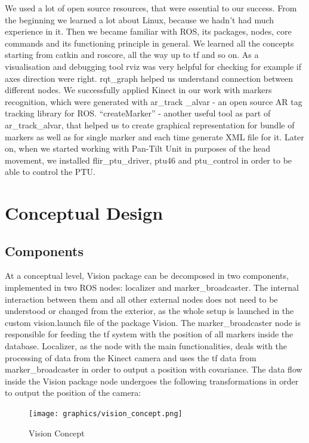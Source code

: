 We used a lot of open source resources, that were essential to our success. From the beginning we learned a lot about Linux, because we hadn’t had much experience in it. Then we became familiar with ROS, its packages, nodes, core commands and its functioning principle in general. We learned all the concepts starting from catkin and roscore, all the way up to tf and so on. As a visualisation and debugging tool rviz was very helpful for checking for example if axes direction were right. rqt\_graph helped us understand connection between different nodes. We successfully applied Kinect in our work with markers recognition, which were generated with ar\_track \_alvar - an open source AR tag tracking library for ROS. “createMarker” - another useful tool as part of ar\_track\_alvar, that helped us to create graphical representation for bundle of markers as well as for single marker and each time generate XML file for it. Later on, when we started working with Pan-Tilt Unit in purposes of the head movement, we installed flir\_ptu\_driver, ptu46 and ptu\_control in order to be able to control the PTU.

\section{Conceptual Design}

\subsection{Components}
At a conceptual level, Vision package can be decomposed in two components, implemented in two ROS nodes: localizer and marker\_broadcaster. The internal interaction between them and all other external nodes does not need to be understood or changed from the exterior, as the whole setup is launched in the custom vision.launch file of the package Vision.
The marker\_broadcaster node is responsible for feeding the tf system with the position of all markers inside the database. Localizer, as the node with the main functionalities, deals with the processing of data from the Kinect camera and uses the tf data from marker\_broadcaster in order to output a position with covariance. The data flow inside the Vision package node undergoes the following transformations in order to output the position of the camera:


\begin{figure}[h]
\begin{center}
\texttt{[image: graphics/vision\_concept.png]}
\caption{Vision Concept}
\label{The transformations which data undergoes from input to outpout}
\end{center}
\end{figure}

